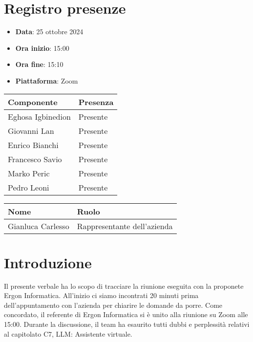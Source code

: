 \documentclass[a4paper, 12pt]{article}
\begin{document}
\section{Registro presenze}
\begin{itemize}
    \item[] \textbf{Data}: 25 ottobre 2024
    \item[] \textbf{Ora inizio}:  15:00
    \item[] \textbf{Ora fine}: 15:10
    \item[] \textbf{Piattaforma}: Zoom	
\end{itemize}
\begin{table}[!h]
\centering
{\renewcommand{\arraystretch}{2}
\begin{tabularx}{\textwidth}{| X | X |}
    \hline
        \textbf{\large Componente} & 
        \textbf{\large Presenza} \\ 
    \hline 
    \hline
        Eghosa Igbinedion&
        Presente \\
    \hline 
        Giovanni Lan&
        Presente \\
    \hline 
        Enrico Bianchi&
        Presente \\
    \hline 
        Francesco Savio&
        Presente \\
    \hline 
        Marko Peric&
        Presente \\
    \hline 
        Pedro Leoni&
        Presente \\
    \hline 

\end{tabularx}}
\end{table}

\begin{table}[!h]
    \centering
    {\renewcommand{\arraystretch}{2}
    \begin{tabularx}{\textwidth}{| X | X |}
        \hline
            \textbf{\large Nome} & 
            \textbf{\large Ruolo} \\ 
        \hline 
        \hline
            Gianluca Carlesso&
            Rappresentante dell'azienda \\
        \hline 

    \end{tabularx}}
\end{table}

\newpage

\section{Introduzione}
Il presente verbale ha lo scopo di tracciare la riunione eseguita con la proponete Ergon Informatica. All'inizio ci siamo incontrati 20 minuti prima dell’appuntamento con l’azienda per chiarire le domande da porre. Come concordato, il referente di Ergon Informatica si è unito alla riunione su Zoom alle 15:00. Durante la discussione, il team ha esaurito tutti dubbi e perplessità relativi al capitolato C7, LLM: Assistente virtuale.
\end{document}
